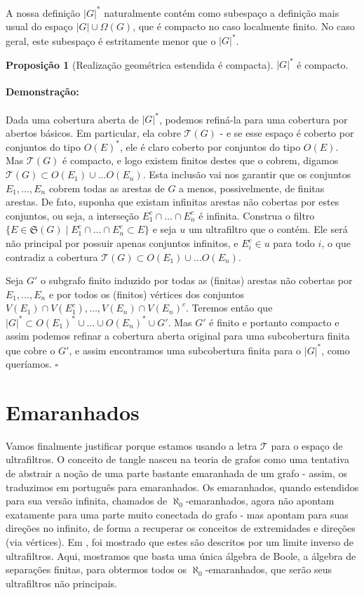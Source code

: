 \documentclass[11pt]{article}
\renewcommand{\textit}[1]{{\fakeitalic#1}}
\newcommand{\pulinho}{\vspace{.5cm}}
\theoremstyle{definition}
\theoremstyle{definition}
\theoremstyle{definition}
\newtheorem{prop}{Proposição}
\newenvironment{proposicao}{
\definecolor{shadecolor}{HTML}{FFDBDF}
\begin{shaded}
\begin{prop}
}
{
\end{prop}
\end{shaded}
}
\theoremstyle{definition}
\theoremstyle{definition}
\theoremstyle{definition}
\theoremstyle{definition}
\theoremstyle{definition}
\theoremstyle{definition}
\theoremstyle{definition}
\theoremstyle{definition}
\theoremstyle{definition}
\newenvironment{prova}{\paragraph{Demonstração:}}{\hfill$\square$ 
\pulinho
}
\begin{document}
A nossa definição $|G|^*$ naturalmente contém como subespaço a definição mais usual do espaço $|G| \cup \Omega(G)$, que é compacto no caso localmente finito. No caso geral, este subespaço é estritamente menor que o $|G|^*$.

\begin{proposicao}[Realização geométrica estendida é compacta]
    $|G|^*$ é compacto.
\end{proposicao}
\begin{prova}
Dada uma cobertura aberta de $|G|^*$, podemos refiná-la para uma cobertura por abertos básicos. Em particular, ela cobre $\mathcal{T}(G)$ - e se esse espaço é coberto por conjuntos do tipo $O(E)^*$, ele é claro coberto por conjuntos do tipo $O(E)$. Mas $\mathcal{T}(G)$ é compacto, e logo existem finitos destes que o cobrem, digamos $\mathcal{T}(G) \subset O(E_1) \cup \dots O(E_n)$. Esta inclusão vai nos garantir que os conjuntos $E_1, \dots, E_n$ cobrem todas as arestas de $G$ a menos, possivelmente, de finitas arestas. De fato, suponha que existam infinitas arestas não cobertas por estes conjuntos, ou seja, a interseção $E_1^c \cap \dots \cap E_n^c$ é infinita. Construa o filtro $\{E \in \mathfrak{S}(G) \mid E_1^c \cap \dots \cap E_n^c \subset E \}$ e seja $u$ um ultrafiltro que o contém. Ele será não principal por possuir apenas conjuntos infinitos, e $E_i^c \in u$ para todo $i$, o que contradiz a cobertura $\mathcal{T}(G) \subset O(E_1) \cup \dots O(E_n)$. 

Seja $G'$ o subgrafo finito induzido por todas as (finitas) arestas não cobertas por $E_1, \dots, E_n$ e por todos os (finitos) vértices dos conjuntos $V(E_1)\cap V(E_1^c), \dots, V(E_n)\cap V(E_n)^c$. Teremos então que $|G|^* \subset O(E_1)^* \cup \dots \cup O(E_n)^* \cup G'$. Mas $G'$ é finito e portanto compacto e assim podemos refinar a cobertura aberta original para uma subcobertura finita que cobre o $G'$, e assim encontramos uma subcobertura finita para o $|G|^*$, como queríamos.
\end{prova}

\section{Emaranhados}

Vamos finalmente justificar porque estamos usando a letra $\mathcal{T}$ para o espaço de ultrafiltros. O conceito de \textit{tangle} nasceu na teoria de grafos como uma tentativa de abstrair a noção de uma parte bastante emaranhada de um grafo - assim, os traduzimos em português para emaranhados. Os emaranhados, quando estendidos para sua versão infinita, chamados de $\aleph_0$-emaranhados, agora não apontam exatamente para uma parte muito conectada do grafo - mas apontam para suas direções no infinito, de forma a recuperar os conceitos de extremidades e direções (via vértices). Em \cite{Diestel2017}, foi mostrado que estes são descritos por um limite inverso de ultrafiltros. Aqui, mostramos que basta uma única álgebra de Boole, a álgebra de separações finitas, para obtermos todos os $\aleph_0$-emaranhados, que serão seus ultrafiltros não principais.
\end{document}
